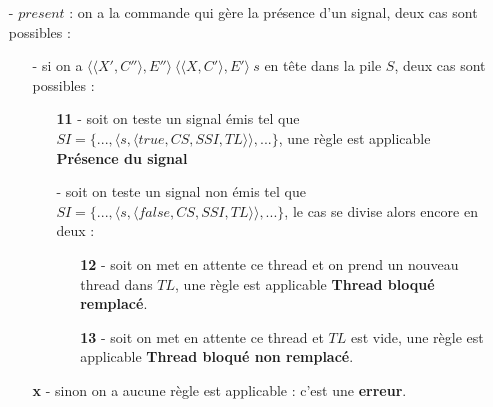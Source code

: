 \documentclass[10pt,a4paper]{report}
\begin{document}
\begin{enumerate}
		\item[-] $present$ : on a la commande qui gère la présence d'un signal, deux cas sont possibles :
		\begin{enumerate}
			\item[-] si on a $\langle\langle X',C''\rangle,E''\rangle~\langle\langle X,C'\rangle,E'\rangle~s$ en tête dans la pile $S$, deux cas sont possibles : 
			\begin{enumerate}
				\item[\textbf{11} -] soit on teste un signal émis tel que $SI = \{...,\langle s,\langle true,CS,SSI,TL\rangle\rangle,...\}$, une règle est applicable \textbf{Présence du signal}
				\item[-] soit on teste un signal non émis tel que $SI = \{...,\langle s,\langle false,CS,SSI,TL\rangle\rangle,...\}$, le cas se divise alors encore en deux :
				\begin{enumerate}
					\item[\textbf{12} -] soit on met en attente ce thread et on prend un nouveau thread dans $TL$, une règle est applicable \textbf{Thread bloqué remplacé}.
					\item[\textbf{13} -] soit on met en attente ce thread et $TL$ est vide, une règle est applicable \textbf{Thread bloqué non remplacé}.
				\end{enumerate}
			\end{enumerate}
			\item[\textbf{x} -] sinon on a aucune règle est applicable : c'est une \textbf{erreur}.
		\end{enumerate}
		\medbreak
		

\end{enumerate}
\end{document}
